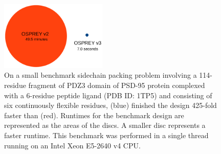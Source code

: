 \begin{figure}
\center
\includegraphics[width=2in]{figures/speedup.pdf}
\caption{On a small benchmark sidechain packing problem involving a 114-residue fragment of PDZ3 domain of PSD-95 protein complexed with a 6-residue peptide ligand (PDB ID: 1TP5) and consisting of six continuously flexible residues,  (blue) finished the design 425-fold faster than  (red). Runtimes for the benchmark design are represented as the areas of the discs. A smaller disc represents a faster runtime. This benchmark was performed in a single thread running on an Intel Xeon E5-2640 v4 CPU.}
\label{fig:speedup}
\end{figure}
